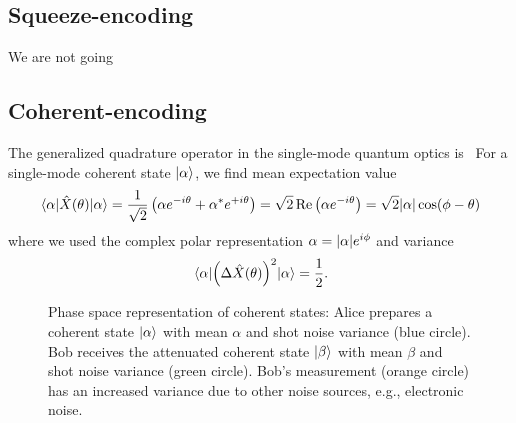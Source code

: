 \FloatBarrier
\subsection{Squeeze-encoding}

We are not going 

\FloatBarrier
\subsection{Coherent-encoding}

The generalized quadrature operator in the single-mode quantum optics is~
For a single-mode coherent state $\ket{\alpha}$, we find mean expectation value
\begin{equation}
	\expval{\hat{X}(\theta)}{\alpha}
	=
	\frac{1}{\sqrt{2}}
	\left(
		\alpha
		e^{-i\theta}
		+
		\alpha^*
		e^{+i\theta}
	\right)
	=
	\sqrt{2}
	\operatorname{\operatorname{Re}}\left(
		\alpha
		e^{-i\theta}
	\right)
	=
	\sqrt{2}
	\abs{\alpha}
	\cos(\phi-\theta)
\end{equation}
where we used the complex polar representation $\alpha=\abs{\alpha}e^{i\phi}$ and variance~\cite[p.~59]{Barnett2002}
\begin{equation}
	\expval{\left(\Delta\hat{X}(\theta)\right)^2}{\alpha}
	=
	\frac{1}{2}
	.
\end{equation}




\begin{figure}[htb]
	\centering
	
	\caption{Phase space representation of coherent states: Alice prepares a coherent state $\ket{\alpha}$ with mean $\alpha$ and shot noise variance (blue circle). Bob receives the attenuated coherent state $\ket{\beta}$ with mean $\beta$ and shot noise variance (green circle). Bob's measurement (orange circle) has an increased variance due to other noise sources, e.g., electronic noise.}
\end{figure}

